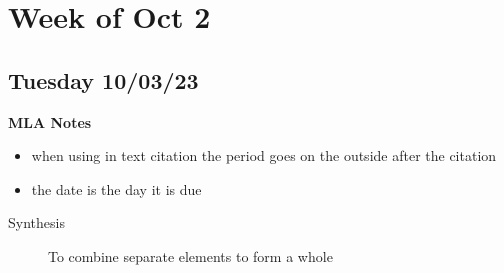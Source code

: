\documentclass[12pt]{article}
\begin{document}
    \tableofcontents \newpage
    \section{Week of Oct 2}
        \subsection{Tuesday 10/03/23}
%              
            \textbf{MLA Notes}
                \begin{itemize}
                    \item when using in text citation the period goes on the outside after the citation
                    \item the date is the day it is due
                \end{itemize}

            \bigskip
            \begin{description}
                \item[Synthesis] To combine separate elements to form a whole
            \end{description}
            

\end{document}
